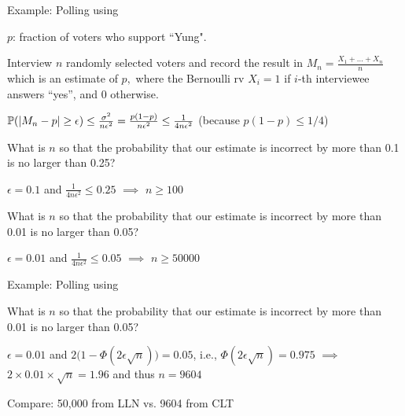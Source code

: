 \begin{frame}{Example: Polling using }

\plitemsep 0.07in

\bci

\item $p$: fraction of voters who support ``Yung".

\item<2-> Interview $n$ randomly selected voters and record the result in $M_n = \frac{X_1+ \ldots + X_n}{n}$ which is an estimate of $p,$ where the Bernoulli rv $X_i=1$ if $i$-th interviewee answers ``yes'', and 0 otherwise.

\item<3-> $\mathbb{P}( |M_n - p| \geq \epsilon ) \leq \frac{\sigma^2}{n\epsilon^2} = \frac{p(1-p)}{n \epsilon^2} \leq \frac{1}{4 n \epsilon^2}$ (because $p(1-p) \leq 1/4$)

\item<4-> \question What is $n$ so that the probability that our estimate is incorrect by more than 0.1 is no larger than 0.25?
\bci
\item<5-> $\epsilon = 0.1$ and $\frac{1}{4 n \epsilon^2} \le 0.25$ $\implies$ $n \geq 100$
\eci

\item<6-> \question What is $n$ so that the probability that our estimate is incorrect by more than 0.01 is no larger than 0.05?
\bci
\item<7-> $\epsilon = 0.01$ and $\frac{1}{4 n \epsilon^2} \le 0.05$ $\implies$ $n \geq 50000$
\eci

\eci
\end{frame}

\begin{frame}{Example: Polling using }


\plitemsep 0.1in
\bci

\item<6-> \question What is $n$ so that the probability that our estimate is incorrect by more than 0.01 is no larger than 0.05?
\bci
\item<7-> $\epsilon = 0.01$ and $2\Big(1 - \Phi(2\epsilon \sqrt{n}) \Big) = 0.05$, i.e.,  $\Phi(2\epsilon \sqrt{n}) = 0.975$ $\implies$ $2\times 0.01 \times \sqrt{n}= 1.96$ and thus $n=9604$
\eci

\item<8-> Compare: 50,000 from LLN vs. 9604 from CLT

\eci
\end{frame}


